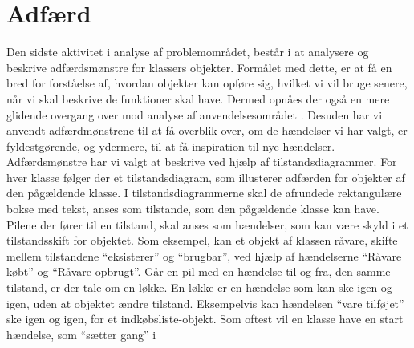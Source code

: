 \section{Adfærd}
\label{sec:adfaerd}

Den sidste aktivitet i analyse af problemområdet, består i at analysere og beskrive adfærdsmønstre for klassers objekter. Formålet med dette, er at få en bred for forståelse af, hvordan objekter kan opføre sig, hvilket vi vil bruge senere, når vi skal beskrive de funktioner \Foodl{} skal have. Dermed opnåes der også en mere glidende overgang over mod analyse af anvendelsesområdet . Desuden har vi anvendt adfærdmønstrene til at få overblik over, om de hændelser vi har valgt, er fyldestgørende, og ydermere, til at få inspiration til nye hændelser. Adfærdsmønstre har vi valgt at beskrive ved hjælp af tilstandsdiagrammer. For hver klasse følger der et tilstandsdiagram, som illusterer adfærden for objekter af den pågældende klasse. I tilstandsdiagrammerne skal de afrundede rektangulære bokse med tekst, anses som tilstande, som den pågældende klasse kan have. Pilene der fører til en tilstand, skal anses som hændelser, som kan være skyld i et tilstandsskift for objektet. Som eksempel, kan et objekt af klassen råvare, skifte mellem tilstandene ``eksisterer'' og ``brugbar'', ved hjælp af hændelserne ``Råvare købt'' og ``Råvare opbrugt''. Går en pil med en hændelse til og fra, den samme tilstand, er der tale om en løkke. En løkke er en hændelse som kan ske igen og igen, uden at objektet ændre tilstand. Eksempelvis kan hændelsen ``vare tilføjet'' ske igen og igen, for et indkøbsliste-objekt. Som oftest vil en klasse have en start hændelse, som ``sætter gang'' i  







%
